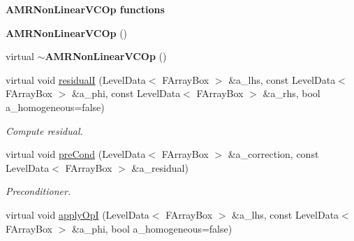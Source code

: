 \begin{Indent}{\bf A\-M\-R\-Non\-Linear\-V\-C\-Op functions}\par
\begin{DoxyCompactItemize}
\item 
\hypertarget{class_a_m_r_non_linear_v_c_op_a3a6584c70d2e7593fe1d535379e21225}{{\bfseries A\-M\-R\-Non\-Linear\-V\-C\-Op} ()}\label{class_a_m_r_non_linear_v_c_op_a3a6584c70d2e7593fe1d535379e21225}

\item 
\hypertarget{class_a_m_r_non_linear_v_c_op_afd2c49ec3bfd649a6638b2052c4ca41a}{virtual {\bfseries $\sim$\-A\-M\-R\-Non\-Linear\-V\-C\-Op} ()}\label{class_a_m_r_non_linear_v_c_op_afd2c49ec3bfd649a6638b2052c4ca41a}

\item 
\hypertarget{class_a_m_r_non_linear_v_c_op_aa682e64a49a2e326c03a99e2212b2abf}{virtual void \hyperlink{class_a_m_r_non_linear_v_c_op_aa682e64a49a2e326c03a99e2212b2abf}{residual\-I} (Level\-Data$<$ F\-Array\-Box $>$ \&a\-\_\-lhs, const Level\-Data$<$ F\-Array\-Box $>$ \&a\-\_\-phi, const Level\-Data$<$ F\-Array\-Box $>$ \&a\-\_\-rhs, bool a\-\_\-homogeneous=false)}\label{class_a_m_r_non_linear_v_c_op_aa682e64a49a2e326c03a99e2212b2abf}

\begin{DoxyCompactList}\small\item\em Compute residual. \end{DoxyCompactList}\item 
\hypertarget{class_a_m_r_non_linear_v_c_op_ad7c0f6f588dec89aed959fe11efce16e}{virtual void \hyperlink{class_a_m_r_non_linear_v_c_op_ad7c0f6f588dec89aed959fe11efce16e}{pre\-Cond} (Level\-Data$<$ F\-Array\-Box $>$ \&a\-\_\-correction, const Level\-Data$<$ F\-Array\-Box $>$ \&a\-\_\-residual)}\label{class_a_m_r_non_linear_v_c_op_ad7c0f6f588dec89aed959fe11efce16e}

\begin{DoxyCompactList}\small\item\em Preconditioner. \end{DoxyCompactList}\item 
\hypertarget{class_a_m_r_non_linear_v_c_op_a459cdb2442f34a5acf5bdd8df385e122}{virtual void \hyperlink{class_a_m_r_non_linear_v_c_op_a459cdb2442f34a5acf5bdd8df385e122}{apply\-Op\-I} (Level\-Data$<$ F\-Array\-Box $>$ \&a\-\_\-lhs, const Level\-Data$<$ F\-Array\-Box $>$ \&a\-\_\-phi, bool a\-\_\-homogeneous=false)}\label{class_a_m_r_non_linear_v_c_op_a459cdb2442f34a5acf5bdd8df385e122}


\end{DoxyCompactItemize}
\end{Indent}
